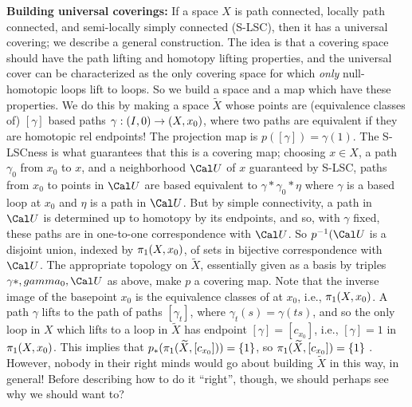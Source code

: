 {\bf Building universal coverings:} If a space $X$ is path connected, locally path connected, and
semi-locally simply connected (S-LSC), then it has a universal covering;
we describe a general construction. The idea is that a covering
space should have the path lifting and homotopy
lifting properties, and the universal 
cover can be characterized as the only covering space for 
which {\it only} null-homotopic loops lift to loops. So we build a 
space and a map which  have these properties.
We do this by making a space $\widetilde{X}$ whose
points are (equivalence classes of) $[\gamma]$
based paths $\gamma:(I,0)\rightarrow (X,x_0)$, where two paths are equivalent
if they are homotopic rel endpoints! The projection map is
$p([\gamma])=\gamma(1)$. The S-LSCness is what guarantees that this is a 
covering map; choosing $x\in X$, a path $\gamma_0$ from $x_0$ to $x$,
and a  neighborhood ${\Cal U}$ of $x$ guaranteed by S-LSC, paths from 
$x_0$ to points in ${\Cal U}$ are based equivalent to $\gamma*\gamma_0*\eta$
where $\gamma$ is a based loop at $x_0$ and $\eta$ is a path in ${\Cal U}$.
But by simple connectivity, a path in ${\Cal U}$ is determined up to homotopy
by its endpoints, and so, with $\gamma$ fixed, these paths are in one-to-one
correspondence with ${\Cal U}$. So $p\inv({\Cal U}$ is a disjoint union,
indexed by $\pi_1(X,x_0)$, of sets in bijective correspondence with ${\Cal U}$.
The appropriate topology on $\widetilde{X}$, essentially given as a basis
by triples $\gamma*,gamma_0,{\Cal U}$ as above, make $p$ a covering map.
Note that the inverse image of 
the basepoint $x_0$ is the equivalence classes of  at $x_0$,
i.e., $\pi_1(X,x_0)$. A path $\gamma$ lifts to the path of paths
$[\gamma_t]$, where $\gamma_t(s)=\gamma(ts)$, and so the only 
loop in $X$ which lifts to a loop in $\widetilde{X}$ has endpoint
$[\gamma]=[c_{x_0}]$, i.e., $[\gamma]=1$ in $\pi_1(X,x_0)$. This
implies that $p_*(\pi_1(\widetilde{X},[c_{x_0}]))=\{1\}$, so 
$\pi_1(\widetilde{X},[c_{x_0}])=\{1\}$ . \hhsk However, nobody in their
right minds would go about building $\widetilde{X}$ in this way, in general!
Before describing how to do it ``right'', though, we should perhaps see why
we should want to?

\msk

